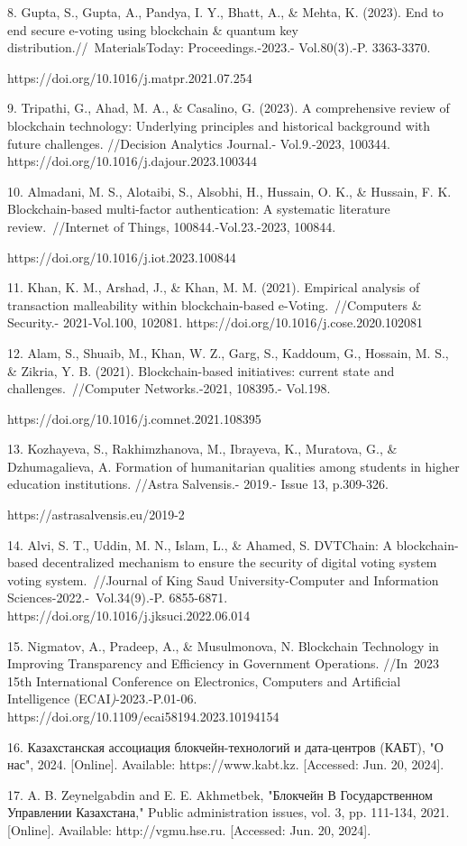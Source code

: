 \begin{noparindent}
8. Gupta, S., Gupta, A., Pandya, I. Y., Bhatt, A., \& Mehta, K. (2023).
End to end secure e-voting using blockchain \& quantum key
distribution.//~MaterialsToday: Proceedings.-2023.- Vol.80(3).-P.
3363-3370.

https://doi.org/10.1016/j.matpr.2021.07.254

9. Tripathi, G., Ahad, M. A., \& Casalino, G. (2023). A comprehensive
review of blockchain technology: Underlying principles and historical
background with future challenges. //Decision Analytics Journal.-
Vol.9.-2023, 100344. https://doi.org/10.1016/j.dajour.2023.100344

10. Almadani, M. S., Alotaibi, S., Alsobhi, H., Hussain, O. K., \&
Hussain, F. K. Blockchain-based multi-factor authentication: A
systematic literature review.~//Internet of Things,
100844.-Vol.23.-2023, 100844.

https://doi.org/10.1016/j.iot.2023.100844

11. Khan, K. M., Arshad, J., \& Khan, M. M. (2021). Empirical analysis
of transaction malleability within blockchain-based
e-Voting.~//Computers \& Security.- 2021-Vol.100, 102081.
https://doi.org/10.1016/j.cose.2020.102081

12. Alam, S., Shuaib, M., Khan, W. Z., Garg, S., Kaddoum, G., Hossain,
M. S., \& Zikria, Y. B. (2021). Blockchain-based initiatives: current
state and challenges.~//Computer Networks.-2021, 108395.- Vol.198.

https://doi.org/10.1016/j.comnet.2021.108395

13. Kozhayeva, S., Rakhimzhanova, M., Ibrayeva, K., Muratova, G., \&
Dzhumagalieva, A. Formation of humanitarian qualities among students in
higher education institutions. //Astra Salvensis.- 2019.- Issue 13,
p.309-326.

https://astrasalvensis.eu/2019-2

14. Alvi, S. T., Uddin, M. N., Islam, L., \& Ahamed, S. DVTChain: A
blockchain-based decentralized mechanism to ensure the security of
digital voting system voting system.~//Journal of King Saud
University-Computer and Information Sciences-2022.-~Vol.34(9).-P.
6855-6871. https://doi.org/10.1016/j.jksuci.2022.06.014

15. Nigmatov, A., Pradeep, A., \& Musulmonova, N. Blockchain Technology
in Improving Transparency and Efficiency in Government Operations.
//In~2023 15th International Conference on Electronics, Computers and
Artificial Intelligence (ECAI\emph{)}-2023.-P.01-06.
https://doi.org/10.1109/ecai58194.2023.10194154

16. Казахстанская ассоциация блокчейн-технологий и дата-центров (КАБТ),
"О нас", 2024. {[}Online{]}. Available: https://www.kabt.kz.
{[}Accessed: Jun. 20, 2024{]}.

17. A. B. Zeynelgabdin and E. E. Akhmetbek, "Блокчейн В Государственном
Управлении Казахстана," Public administration issues, vol. 3, pp.
111-134, 2021. {[}Online{]}. Available: http://vgmu.hse.ru. {[}Accessed:
Jun. 20, 2024{]}.
\end{noparindent}

